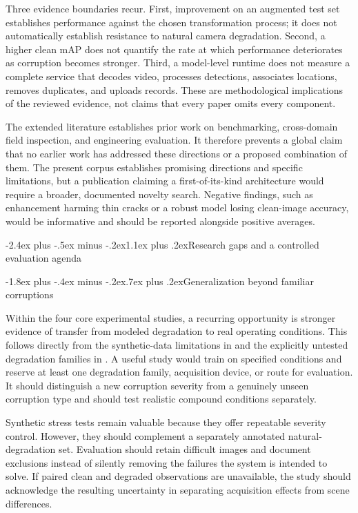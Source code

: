 \documentclass[11pt,a4paper]{article}
\makeatletter
\renewcommand\section{\@startsection{section}{1}{\z@}%
  {-2.4ex plus -.5ex minus -.2ex}{1.1ex plus .2ex}{\normalfont\large\bfseries}}
\renewcommand\subsection{\@startsection{subsection}{2}{\z@}%
  {-1.8ex plus -.4ex minus -.2ex}{.7ex plus .2ex}{\normalfont\normalsize\bfseries}}
\makeatother
\begin{document}
Three evidence boundaries recur. First, improvement on an augmented test set establishes performance against the chosen transformation process; it does not automatically establish resistance to natural camera degradation. Second, a higher clean mAP does not quantify the rate at which performance deteriorates as corruption becomes stronger. Third, a model-level runtime does not measure a complete service that decodes video, processes detections, associates locations, removes duplicates, and uploads records. These are methodological implications of the reviewed evidence, not claims that every paper omits every component.

The extended literature establishes prior work on benchmarking, cross-domain field inspection, and engineering evaluation. It therefore prevents a global claim that no earlier work has addressed these directions or a proposed combination of them. The present corpus establishes promising directions and specific limitations, but a publication claiming a first-of-its-kind architecture would require a broader, documented novelty search. Negative findings, such as enhancement harming thin cracks or a robust model losing clean-image accuracy, would be informative and should be reported alongside positive averages.

\section{Research gaps and a controlled evaluation agenda}

\subsection{Generalization beyond familiar corruptions}

Within the four core experimental studies, a recurring opportunity is stronger evidence of transfer from modeled degradation to real operating conditions. This follows directly from the synthetic-data limitations in \cite{r4,r5} and the explicitly untested degradation families in \cite{r6}. A useful study would train on specified conditions and reserve at least one degradation family, acquisition device, or route for evaluation. It should distinguish a new corruption severity from a genuinely unseen corruption type and should test realistic compound conditions separately.

Synthetic stress tests remain valuable because they offer repeatable severity control. However, they should complement a separately annotated natural-degradation set. Evaluation should retain difficult images and document exclusions instead of silently removing the failures the system is intended to solve. If paired clean and degraded observations are unavailable, the study should acknowledge the resulting uncertainty in separating acquisition effects from scene differences.
\end{document}
